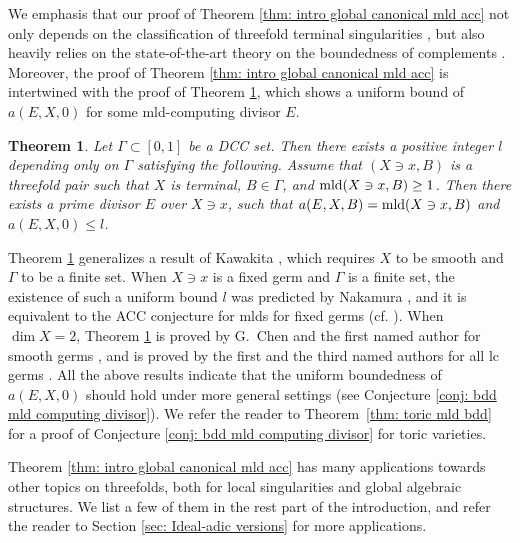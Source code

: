 \documentclass[11pt]{amsart}
\numberwithin{equation}{section}
\newcommand{\mld}{{\rm{mld}}}
\newcommand{\Ii}{{\Gamma}}
\newtheorem{thm}{Theorem}[section]
\theoremstyle{definition}
\theoremstyle{definition}
\begin{document}
\medskip

We emphasis that our proof of Theorem \ref{thm: intro global canonical mld acc} not only depends on the classification of threefold terminal singularities \cite{Kaw01,Kaw02,Kaw03,Kaw05,Yam18}, but also heavily relies on the state-of-the-art theory on the boundedness of complements \cite{Bir19,HLS19,Sho20}. Moreover, the proof of Theorem \ref{thm: intro global canonical mld acc} is intertwined with the proof of Theorem \ref{thm: mn intro DCC coeff}, which shows a uniform bound of $a(E,X,0)$ for some mld-computing divisor $E$.

\begin{thm}\label{thm: mn intro DCC coeff}
Let $\Ii\subset [0,1]$ be a DCC set. Then there exists a positive integer $l$ depending only on $\Ii$ satisfying the following. Assume that $(X\ni x,B)$ is a threefold pair such that $X$ is terminal, $B\in\Ii$, and $\mld(X\ni x,B)\geq 1$. Then there exists a prime divisor $E$ over $X\ni x$, such that $a(E,X,B)=\mld(X\ni x,B)$ and $a(E,X,0)\leq l$.
\end{thm}

Theorem \ref{thm: mn intro DCC coeff} generalizes a result of Kawakita \cite[Theorem 1.3(ii)]{Kaw21}, which requires $X$ to be smooth and $\Ii$ to be a finite set. When $X\ni x$ is a fixed germ and $\Ii$ is a finite set, the existence of such a uniform bound $l$ was predicted by Nakamura \cite[Conjecture 1.1]{MN18}, and it is equivalent to the ACC conjecture for mlds for fixed germs (cf. \cite[Theorem 4.6]{Kaw21}). When $\dim X=2$, Theorem \ref{thm: mn intro DCC coeff} is proved by G.~Chen and the first named author for smooth germs \cite[Theorem B.1]{CH21}, and is proved by the first and the third named authors for all lc germs \cite[Theorem 1.1]{HL20}. All the above results indicate that the uniform boundedness of $a(E,X,0)$ should hold under more general settings (see Conjecture \ref{conj: bdd mld computing divisor}). We refer the reader to Theorem~\ref{thm: toric mld bdd} for a proof of Conjecture \ref{conj: bdd mld computing divisor} for toric varieties.

\medskip

Theorem \ref{thm: intro global canonical mld acc} has many applications towards other topics on threefolds, both for local singularities and global algebraic structures. We list a few of them in the rest part of the introduction, and refer the reader to Section \ref{sec: Ideal-adic versions} for more applications.

\medskip
\end{document}
